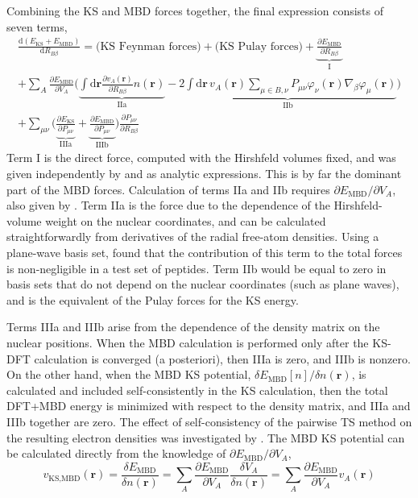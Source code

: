 Combining the KS and MBD forces together, the final expression consists of seven terms,
\begin{multline}
\frac{\mathrm d(E_\text{KS}+E_\text{MBD})}{\mathrm dR_{B\beta}}=\text{(KS Feynman forces)}+\text{(KS Pulay forces)}
+\underbrace{\frac{\partial E_\text{MBD}}{\partial R_{B\beta}}}_\text{I}\\
+\sum_A\frac{\partial E_\text{MBD}}{\partial V_A}\Bigg(\underbrace{\int\mathrm d\mathbf r\frac{\partial v_A(\mathbf r)}{\partial R_{B\beta}}n(\mathbf r)}_\text{IIa}-\underbrace{2\int\mathrm d\mathbf r\,v_A(\mathbf r)\sum_{\mu\in B,\nu} P_{\mu\nu}\varphi_\nu(\mathbf r)\nabla_\beta\varphi_\mu(\mathbf r)}_{\text{IIb}}\Bigg)\\
+\sum_{\mu\nu}\Bigg(\underbrace{\frac{\partial E_\text{KS}}{\partial P_{\mu\nu}}}_\text{IIIa}+\underbrace{\frac{\partial E_\text{MBD}}{\partial P_{\mu\nu}}}_\text{IIIb}\Bigg)\frac{\partial P_{\mu\nu}}{\partial R_{B\beta}}
\label{eq:mbd-forces}
\end{multline}
Term I is the direct force, computed with the Hirshfeld volumes fixed, and was given independently by \citet{Blood-ForsytheCS16} and \citet{BuckoJPCM16} as analytic expressions.
This is by far the dominant part of the MBD forces.
Calculation of terms IIa and IIb requires $\partial E_\text{MBD}/\partial V_A$, also given by \citet{Blood-ForsytheCS16}.
Term IIa is the force due to the dependence of the Hirshfeld-volume weight on the nuclear coordinates, and can be calculated straightforwardly from derivatives of the radial free-atom densities.
Using a plane-wave basis set, \citet{Blood-ForsytheCS16} found that the contribution of this term to the total forces is non-negligible in a test set of peptides.
Term IIb would be equal to zero in basis sets that do not depend on the nuclear coordinates (such as plane waves), and is the equivalent of the Pulay forces for the KS energy.

Terms IIIa and IIIb arise from the dependence of the density matrix on the nuclear positions.
When the MBD calculation is performed only after the KS-DFT calculation is converged (a posteriori), then IIIa is zero, and IIIb is nonzero.
On the other hand, when the MBD KS potential, $\delta E_\text{MBD}[n]/\delta n(\mathbf r)$, is calculated and included self-consistently in the KS calculation, then the total DFT+MBD energy is minimized with respect to the density matrix, and IIIa and IIIb together are zero.
The effect of self-consistency of the pairwise TS method on the resulting electron densities was investigated by \citet{FerriPRL15}.
The MBD KS potential can be calculated directly from the knowledge of $\partial E_\text{MBD}/\partial V_A$,
\begin{equation}
	v_\text{KS,MBD}(\mathbf r)=\frac{\delta E_\text{MBD}}{\delta n(\mathbf r)}=\sum_A\frac{\partial E_\text{MBD}}{\partial V_A}\frac{\delta V_A}{\delta n(\mathbf r)}=\sum_A\frac{\partial E_\text{MBD}}{\partial V_A}v_A(\mathbf r)
\end{equation}

